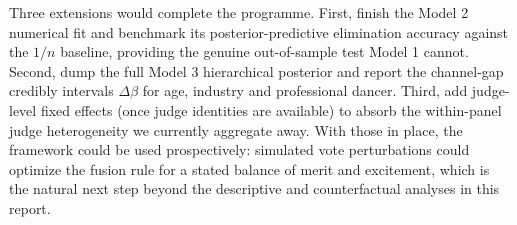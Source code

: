 \documentclass{article}
\begin{document}
Three extensions would complete the programme. First, finish the Model 2 numerical fit and
benchmark its posterior-predictive elimination accuracy against the $1/n$ baseline, providing
the genuine out-of-sample test Model 1 cannot. Second, dump the full Model 3 hierarchical
posterior and report the channel-gap credibly intervals $\Delta\beta$ for age, industry and
professional dancer. Third, add judge-level fixed effects (once judge identities are
available) to absorb the within-panel judge heterogeneity we currently aggregate away. With
those in place, the framework could be used prospectively: simulated vote perturbations could
optimize the fusion rule for a stated balance of merit and excitement, which is the natural
next step beyond the descriptive and counterfactual analyses in this report.

\end{document}
